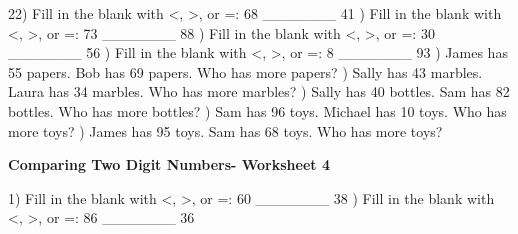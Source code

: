\documentclass{article}%
\begin{document}
22) Fill in the blank with <, >, or =: 68 \_\_\_\_\_\_\_ 41%
\newline%
\newline%
) Fill in the blank with <, >, or =: 73 \_\_\_\_\_\_\_ 88%
\newline%
\newline%
) Fill in the blank with <, >, or =: 30 \_\_\_\_\_\_\_ 56%
\newline%
\newline%
) Fill in the blank with <, >, or =: 8 \_\_\_\_\_\_\_ 93%
\newline%
\newline%
) James has 55 papers. Bob has 69 papers. Who has more papers?%
\newline%
\newline%
) Sally has 43 marbles. Laura has 34 marbles. Who has more marbles?%
\newline%
\newline%
) Sally has 40 bottles. Sam has 82 bottles. Who has more bottles?%
\newline%
\newline%
) Sam has 96 toys. Michael has 10 toys. Who has more toys?%
\newline%
\newline%
) James has 95 toys. Sam has 68 toys. Who has more toys?%
\newline%
\newline%
\newline%
\pagebreak%
\large%
\begin{center}%
\textbf{Comparing Two Digit Numbers- Worksheet 4}%
\newline%
\newline%
\newline%
\end{center} \normalsize%
1) Fill in the blank with <, >, or =: 60 \_\_\_\_\_\_\_ 38%
\newline%
\newline%
) Fill in the blank with <, >, or =: 86 \_\_\_\_\_\_\_ 36%
\newline%
\newline%
\end{document}
